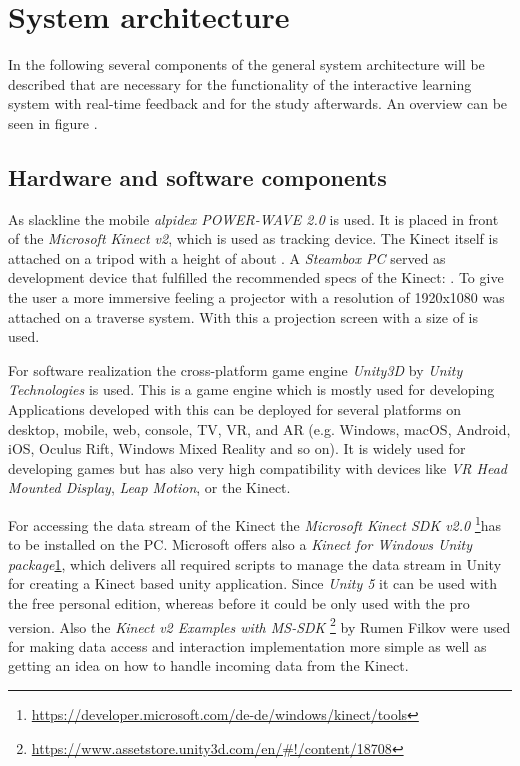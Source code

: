 \section{System architecture}\label{5_3_systemArchitecture}
In the following several components of the general system architecture will be described that are necessary for the functionality of the interactive learning system with real-time feedback and for the study afterwards. An overview can be seen in figure .

\subsection{Hardware and software components}

As slackline the mobile \textit{alpidex POWER-WAVE 2.0} is used. It is placed in front of the \textit{Microsoft Kinect v2}, which is used as tracking device. The Kinect itself is attached on a  tripod with a height of about . A \textit{Steambox PC}  served as development device that fulfilled the recommended specs of the Kinect: . To give the user a more immersive feeling a projector  with a resolution of 1920x1080 was attached on a traverse system. With this a projection screen with a size of  is used.

For software realization the cross-platform game engine \textit{Unity3D} by \textit{Unity Technologies} is used. This is a game engine which is mostly used for developing
Applications developed with this can be deployed for several platforms on desktop, mobile, web, console, TV, VR, and AR (e.g. Windows, macOS, Android, iOS, Oculus Rift, Windows Mixed Reality and so on). It is widely used for developing games but has also very high compatibility with devices like \textit{VR Head Mounted Display}, \textit{Leap Motion}, or the Kinect.

 For accessing the data stream of the Kinect the \textit{Microsoft Kinect SDK v2.0}
\footnote{\label{fn:kinectTools}\url{https://developer.microsoft.com/de-de/windows/kinect/tools}}has to be installed on the PC. Microsoft offers also a \textit{Kinect for Windows Unity package}\cref{fn:kinectTools}, which delivers all required scripts to manage the data stream in Unity for creating a Kinect based unity application. Since \textit{Unity 5} it can be used with the free personal edition, whereas before it could be only used with the pro version. Also the \textit{Kinect v2 Examples with MS-SDK} \footnote{\url{https://www.assetstore.unity3d.com/en/\#!/content/18708}} by Rumen Filkov were used for making data access and interaction implementation more simple as well as getting an idea on how to handle incoming data from the Kinect.

